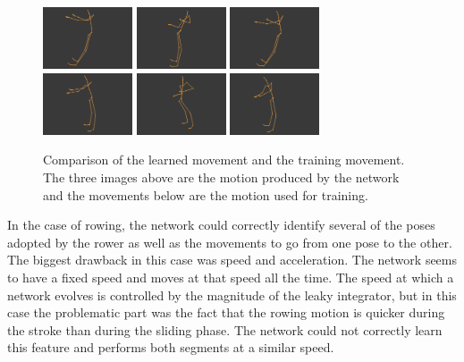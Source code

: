 \documentclass[letterpaper,9pt]{article}
\begin{document}
\begin{figure}[h!]
  \centering
  \includegraphics[width=100px]{Extra/out_row_1.png}
  \includegraphics[width=100px]{Extra/out_row_2.png}
  \includegraphics[width=100px]{Extra/out_row_3.png}\\
  \includegraphics[width=100px]{Extra/teach_row_1.png}
  \includegraphics[width=100px]{Extra/teach_row_2.png}
  \includegraphics[width=100px]{Extra/teach_row_3.png}
    \caption[Rowing]{Comparison of the learned movement and the training movement. The three images above are the motion produced by the network and the movements below are the motion used for training.}
\end{figure}

In the case of rowing, the network could correctly identify several of the poses adopted by the rower as well as the movements to go from one pose to the other. The biggest drawback in this case was speed and acceleration. The network seems to have a fixed speed and moves at that speed all the time. The speed at which a network evolves is controlled by the magnitude of the leaky integrator, but in this case the problematic part was the fact that the rowing motion is quicker during the stroke than during the sliding phase. The network could not correctly learn this feature and performs both segments at a similar speed.
\end{document}
